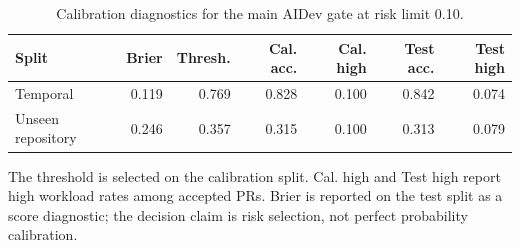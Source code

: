 \begin{table}[t]
\centering
\scriptsize
\caption{Calibration diagnostics for the main AIDev gate at risk limit 0.10.}
\label{tab:aidev-calibration}
\setlength{\tabcolsep}{3pt}
\begin{tabular}{lrrrrrr}
\toprule
Split & Brier & Thresh. & Cal. acc. & Cal. high & Test acc. & Test high \\
\midrule
Temporal & 0.119 & 0.769 & 0.828 & 0.100 & 0.842 & 0.074 \\
Unseen repository & 0.246 & 0.357 & 0.315 & 0.100 & 0.313 & 0.079 \\
\bottomrule
\end{tabular}
\par\footnotesize{The threshold is selected on the calibration split. Cal. high and Test high report high workload rates among accepted PRs. Brier is reported on the test split as a score diagnostic; the decision claim is risk selection, not perfect probability calibration.}
\end{table}
